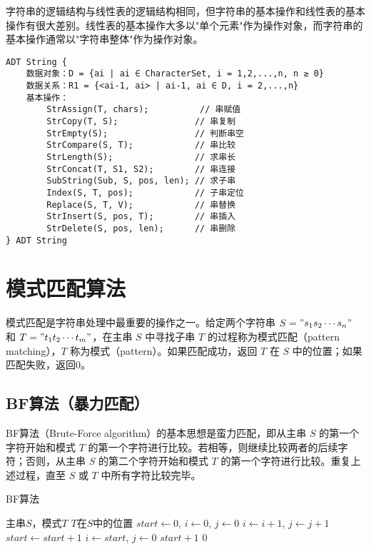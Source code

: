 \documentclass[12pt,a4paper]{amsart}
\begin{document}
字符串的逻辑结构与线性表的逻辑结构相同，但字符串的基本操作和线性表的基本操作有很大差别。线性表的基本操作大多以"单个元素"作为操作对象，而字符串的基本操作通常以"字符串整体"作为操作对象。

\begin{lstlisting}[caption=字符串抽象数据类型]
ADT String {
    数据对象：D = {ai | ai ∈ CharacterSet, i = 1,2,...,n, n ≥ 0}
    数据关系：R1 = {<ai-1, ai> | ai-1, ai ∈ D, i = 2,...,n}
    基本操作：
        StrAssign(T, chars);          // 串赋值
        StrCopy(T, S);               // 串复制
        StrEmpty(S);                 // 判断串空
        StrCompare(S, T);            // 串比较
        StrLength(S);                // 求串长
        StrConcat(T, S1, S2);        // 串连接
        SubString(Sub, S, pos, len); // 求子串
        Index(S, T, pos);            // 子串定位
        Replace(S, T, V);            // 串替换
        StrInsert(S, pos, T);        // 串插入
        StrDelete(S, pos, len);      // 串删除
} ADT String
\end{lstlisting}

\section{模式匹配算法}

模式匹配是字符串处理中最重要的操作之一。给定两个字符串 $S = "s_1s_2\cdots s_n"$ 和 $T = "t_1t_2\cdots t_m"$，在主串 $S$ 中寻找子串 $T$ 的过程称为模式匹配（pattern matching），$T$ 称为模式（pattern）。如果匹配成功，返回 $T$ 在 $S$ 中的位置；如果匹配失败，返回0。

\subsection{BF算法（暴力匹配）}

BF算法（Brute-Force algorithm）的基本思想是蛮力匹配，即从主串 $S$ 的第一个字符开始和模式 $T$ 的第一个字符进行比较。若相等，则继续比较两者的后续字符；否则，从主串 $S$ 的第二个字符开始和模式 $T$ 的第一个字符进行比较。重复上述过程，直至 $S$ 或 $T$ 中所有字符比较完毕。

\begin{algorithm}[H]
\caption{BF算法}
\begin{algorithmic}[1]
\REQUIRE 主串$S$，模式$T$
\ENSURE $T$在$S$中的位置
\STATE $start \leftarrow 0$, $i \leftarrow 0$, $j \leftarrow 0$
        \STATE $i \leftarrow i + 1$, $j \leftarrow j + 1$
    \ELSE
        \STATE $start \leftarrow start + 1$
        \STATE $i \leftarrow start$, $j \leftarrow 0$
    \ENDIF
\ENDWHILE
{}
    \RETURN $start + 1$
\ELSE
    \RETURN $0$
\ENDIF
\end{algorithmic}
\end{algorithm}
\end{document}
